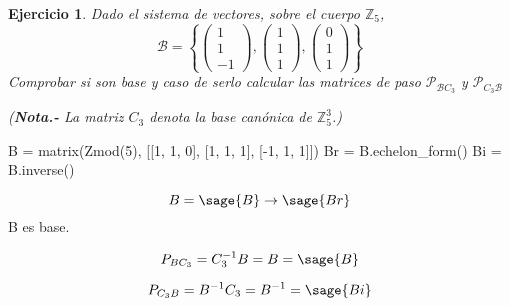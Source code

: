 \documentclass{amsart}
\newtheorem{ejer}{Ejercicio}
\def\z{\mathbb{Z}}
\begin{document}
\begin{ejer} Dado el sistema de vectores, sobre el cuerpo $\z _5$, 
\[\mathcal{B} = \left\lbrace \left( \begin{array}{r}
1 \\ 1 \\ -1            
\end{array} \right), 
\left( \begin{array}{c}
           
1 \\ 1 \\ 1           
\end{array} \right), 
\left( \begin{array}{c}
           
0 \\ 1 \\ 1           
\end{array} \right) \right\rbrace \] Comprobar si son base y caso de serlo calcular 
las matrices de paso $\mathcal{P}_{\mathcal{B}C_{3}}$ y $\mathcal{P}_{C_{3}\mathcal{B}}$

({\bf Nota.-} La matriz $C_3$ denota la base can\'onica de $\z ^3_5$.)
\end{ejer}

\begin{sageblock}
	B = matrix(Zmod(5), [[1, 1, 0], [1, 1, 1], [-1, 1, 1]])
	Br = B.echelon_form()
	Bi = B.inverse()
\end{sageblock}

$$
	B = \sage{B} \to  \sage{Br}
$$
B es base.

$$
	P_{BC_3} = C_3^{-1} B = B = \sage{B}
$$

$$
	P_{C_3B} = B^{-1} C_3 = B^{-1} = \sage{Bi}
$$
\end{document}
